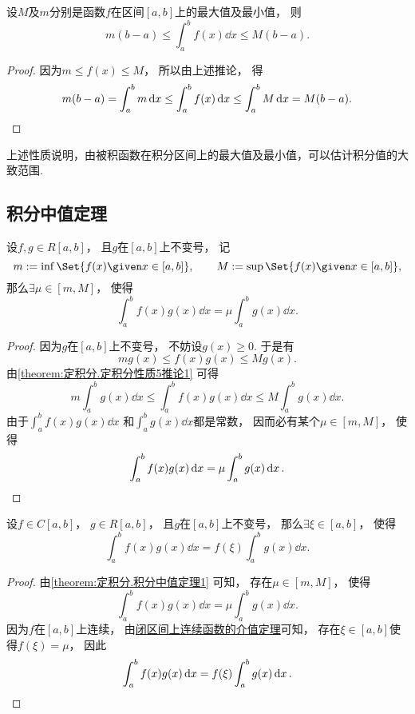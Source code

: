 \begin{property}\label{theorem:定积分.定积分性质6}
设\(M\)及\(m\)分别是函数\(f\)在区间\([a,b]\)上的最大值及最小值，
则\[
	m(b-a) \leq \int_a^b f(x) \dd{x} \leq M(b-a).
\]
\begin{proof}
因为\(m \leq f(x) \leq M\)，
所以由上述推论，
得\[
	m(b-a)
	= \int_a^b m \dd{x}
	\leq \int_a^b f(x) \dd{x}
	\leq \int_a^b M \dd{x}
	= M(b-a).
	\qedhere
\]
\end{proof}
\end{property}
上述性质说明，由被积函数在积分区间上的最大值及最小值，可以估计积分值的大致范围.

\subsection{积分中值定理}
\begin{theorem}[积分第一中值定理]\label{theorem:定积分.积分中值定理1}
设\(f,g \in R[a,b]\)，
且\(g\)在\([a,b]\)上不变号，
记\[
	m \defeq \inf\Set{ f(x) \given x \in [a,b] }, \qquad
	M \defeq \sup\Set{ f(x) \given x \in [a,b] },
\]
那么\(\exists\mu\in[m,M]\)，
使得\begin{equation}
	\int_a^b f(x) g(x) \dd{x} = \mu \int_a^b g(x) \dd{x}.
\end{equation}
\begin{proof}
因为\(g\)在\([a,b]\)上不变号，
不妨设\(g(x)\geq0\).
于是有\[
	m g(x) \leq f(x) g(x) \leq M g(x).
\]
由\cref{theorem:定积分.定积分性质5推论1} 可得\[
	m \int_a^b g(x) \dd{x}
	\leq \int_a^b f(x) g(x) \dd{x}
	\leq M \int_a^b g(x) \dd{x}.
\]
由于\(\int_a^b f(x) g(x) \dd{x}\)
和\(\int_a^b g(x) \dd{x}\)都是常数，
因而必有某个\(\mu\in[m,M]\)，
使得\[
	\int_a^b f(x) g(x) \dd{x}
	= \mu \int_a^b g(x) \dd{x}.
	\qedhere
\]
\end{proof}
\end{theorem}

\begin{corollary}\label{theorem:定积分.积分中值定理1推论1}
设\(f \in C[a,b]\)，
\(g \in R[a,b]\)，
且\(g\)在\([a,b]\)上不变号，
那么\(\exists\xi\in[a,b]\)，
使得\begin{equation}
	\int_a^b f(x) g(x) \dd{x}
	= f(\xi) \int_a^b g(x) \dd{x}.
\end{equation}
\begin{proof}
由\cref{theorem:定积分.积分中值定理1} 可知，
存在\(\mu\in[m,M]\)，
使得\[
	\int_a^b f(x) g(x) \dd{x}
	= \mu \int_a^b g(x) \dd{x}.
\]
因为\(f\)在\([a,b]\)上连续，
由\hyperref[theorem:极限.闭区间上连续函数的性质.介值定理2]{闭区间上连续函数的介值定理}可知，
存在\(\xi\in[a,b]\)使得\(f(\xi) = \mu\)，
因此\[
	\int_a^b f(x) g(x) \dd{x}
	= f(\xi) \int_a^b g(x) \dd{x}.
	\qedhere
\]
\end{proof}
\end{corollary}

